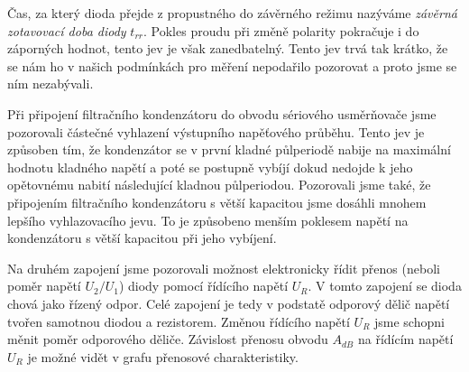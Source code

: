 \documentclass[a4paper, czech]{article}
\begin{document}
Čas, za který dioda přejde z propustného do závěrného režimu nazýváme \textit{závěrná zotavovací doba diody} $t_{rr}$. Pokles proudu při změně polarity pokračuje i do záporných hodnot, tento jev je však zanedbatelný. Tento jev trvá tak krátko, že se nám ho v našich podmínkách pro měření nepodařilo pozorovat a proto jsme se ním nezabývali.

Při připojení filtračního kondenzátoru do obvodu sériového usměrňovače jsme pozorovali částečné vyhlazení výstupního napěťového průběhu. Tento jev je způsoben tím, že kondenzátor se v první kladné půlperiodě nabije na maximální hodnotu kladného napětí a poté se postupně vybíjí dokud nedojde k jeho opětovnému nabití následující kladnou půlperiodou. Pozorovali jsme také, že připojením filtračního kondenzátoru s větší kapacitou jsme dosáhli mnohem lepšího vyhlazovacího jevu. To je způsobeno menším poklesem napětí na kondenzátoru s větší kapacitou při jeho vybíjení.

Na druhém zapojení jsme pozorovali možnost elektronicky řídit přenos (neboli poměr napětí $U_2/U_1$) diody pomocí řídícího napětí $U_R$. V tomto zapojení se dioda chová jako řízený odpor. Celé zapojení je tedy v podstatě odporový dělič napětí tvořen samotnou diodou a rezistorem. Změnou řídícího napětí $U_R$ jsme schopni měnit poměr odporového děliče. Závislost přenosu obvodu $A_{dB}$ na řídícím napětí $U_R$ je možné vidět v grafu přenosové charakteristiky.
\end{document}
